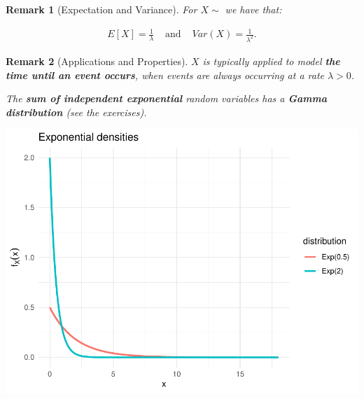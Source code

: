 \documentclass[smaller]{beamer}\usepackage[]{graphicx}\usepackage[]{color}
\newenvironment{knitrout}{}{} %
\newtheorem{remark}{Remark}[section]
\newcommand{\bea}{\begin{eqnarray}}
\newcommand{\eea}{\end{eqnarray}}
\begin{document}
\begin{frame}{\secname}
  \begin{remark}[Expectation and Variance]
    For $X\sim$  we have that:
    \begin{small}
    \bea
    E[X]= \frac{1}{\lambda} & \text{ and } &   Var(X)=\frac{1}{\lambda^{2}}.
    \eea
    \end{small}
  \end{remark}
  \pause

  \begin{remark}[Applications and Properties]
    $X$ is typically applied to model \textbf{the time until an event occurs}, when events are always occurring at a  rate $\lambda >0$. \bigskip

    \bigskip

    \bigskip

    \bigskip

    \bigskip


    The \textbf{sum of independent exponential} random variables has a \textbf{Gamma distribution} (see the exercises).
  \end{remark}
\end{frame}

\begin{frame}{\secname}
  \begin{example}
\begin{knitrout}
\color{fgcolor}

\includegraphics[width=0.5\linewidth]{figure/unnamed-chunk-2-1} \hfill{}



\end{knitrout}
  \end{example}
\end{frame}
\end{document}

